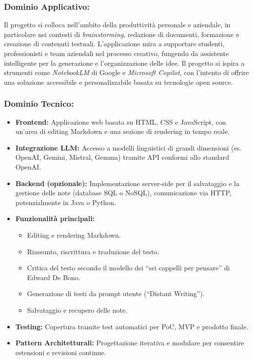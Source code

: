 \documentclass[a4paper,12pt]{article}
\begin{document}
\subsubsection*{Dominio Applicativo:}
Il progetto si colloca nell'ambito della produttività personale e aziendale, in particolare nei contesti di \textit{brainstorming}, redazione di documenti, formazione e creazione di contenuti testuali.
L'applicazione mira a supportare studenti, professionisti e team aziendali nel processo creativo, fungendo da assistente intelligente per la generazione e l'organizzazione delle idee.
Il progetto si ispira a strumenti come \textit{NotebookLM} di Google e \textit{Microsoft Copilot}, con l'intento di offrire una soluzione accessibile e personalizzabile basata su tecnologie open source.

\subsubsection*{Dominio Tecnico:}
\begin{itemize}
    \item \textbf{Frontend:} Applicazione web basata su HTML, CSS e JavaScript, con un'area di editing Markdown e una sezione di rendering in tempo reale.
    \item \textbf{Integrazione LLM:} Accesso a modelli linguistici di grandi dimensioni (es. OpenAI, Gemini, Mistral, Gemma) tramite API conformi allo standard OpenAI.
    \item \textbf{Backend (opzionale):} Implementazione server-side per il salvataggio e la gestione delle note (database SQL o NoSQL), comunicazione via HTTP, potenzialmente in Java o Python.
    \item \textbf{Funzionalità principali:}
          \begin{itemize}
              \item Editing e rendering Markdown.
              \item Riassunto, riscrittura e traduzione del testo.
              \item Critica del testo secondo il modello dei “sei cappelli per pensare” di Edward
                    De Bono.
              \item Generazione di testi da prompt utente (“Distant Writing”).
              \item Salvataggio e recupero delle note.
          \end{itemize}
    \item \textbf{Testing:} Copertura tramite test automatici per PoC, MVP e prodotto finale.
    \item \textbf{Pattern Architetturali:} Progettazione iterativa e modulare per consentire estensioni e revisioni continue.
\end{itemize}
\end{document}
